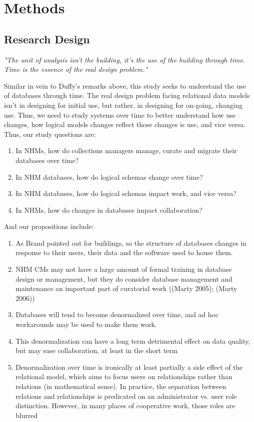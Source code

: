 \section{Methods}

\subsection{Research Design}
\textit{"The unit of analysis isn't the building, it's the use of the building through time. Time is the essence of the real design problem."}\cite{duffy1990measuring}

Similar in vein to Duffy's remarks above, this study seeks to understand the use of databases through time. The real design problem facing relational data models isn't in designing for initial use, but rather, in designing for on-going, changing use.  Thus, we need to study systems over time to better understand how use changes, how logical models changes reflect those changes is use, and vice versa.  Thus, our study questions are:
\begin{enumerate}
\item In NHMs, how do collections managers manage, curate and migrate their databases over time?
\item In NHM databases, how do logical schemas change over time?
\item In NHM databases, how do logical schemas impact work, and vice versa?
\item In NHMs, how do changes in databases impact collaboration?
\end{enumerate}

And our propositions include:
\begin{enumerate}
\item As Brand pointed out for buildings, so the structure of databases changes in response to their users, their data and the software used to house them.
\item NHM CMs may not have a large amount of formal training in database design or management, but they do consider database management and maintenance an important part of curatorial work ((Marty 2005); (Marty 2006))
\item Databases will tend to become denormalized over time, and ad hoc workarounds may be used to make them work.
\item This denormalization can have a long term detrimental effect on data quality, but may ease collaboration, at least in the short term
\item Denormalization over time is ironically at least partially a side effect of the relational model, which aims to focus users on relationships rather than relations (in mathematical sense). In practice, the separation between relations and relationships is predicated on an administrator vs. user role distinction. However, in many places of cooperative work, those roles are blurred
\end{enumerate}

